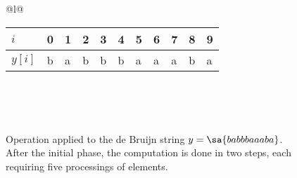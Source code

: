\begin{figure}
\begin{tabular}{@{}l@{}}
\begin{tabular}{@{}l@{\qquad}*{10}l@{}}
$i$ &0&1&2&3&4&5&6&7&8&9 \\
\hline
$y[i]$  &\sa b&\sa a&\sa b&\sa b&\sa b&\sa a&\sa a&\sa a&\sa b&\sa a
\end{tabular}
\\\\
\begin{tabular}{@{}l@{}}\end{tabular}
\end{tabular}
\caption{\label{figu-partdB}
Operation  applied to the de Bruijn string
 $y=\sa{babbbaaaba}$.
After the initial phase, the computation is done in two steps,
 each requiring five processings of elements.}
\end{figure}

